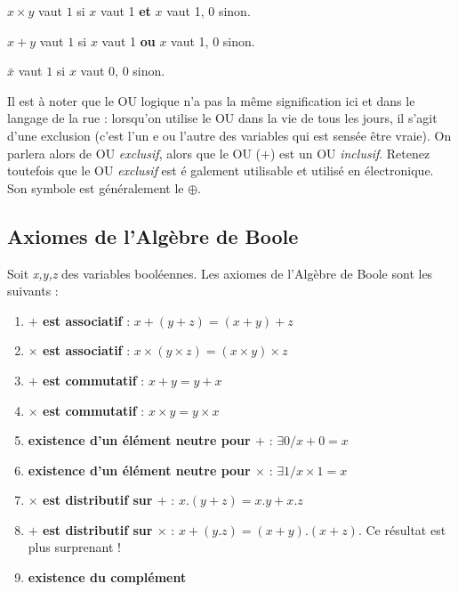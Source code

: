 $x \times y$ vaut $1$ si $x$ vaut 1 {\bf et}  $x$ vaut 1, $0$ sinon.

$x + y$ vaut $1$ si $x$ vaut 1 {\bf ou}  $x$ vaut 1, $0$ sinon.

$\bar{x}$ vaut $1$ si $x$ vaut 0, $0$ sinon.

Il est à noter que le OU logique n'a pas la même signification ici et dans le langage de la rue : lorsqu'on utilise le OU dans la vie de tous les jours, il s'agit d'une exclusion (c'est l'un
e ou l'autre des variables qui est sensée être vraie). On parlera alors de OU {\it exclusif}, alors que le OU ($+$) est un OU {\it inclusif}. Retenez toutefois que le OU {\it exclusif} est é
galement utilisable et utilisé en électronique. Son symbole est généralement le $\oplus$.

\subsection{Axiomes de l'Algèbre de Boole}
Soit {\it x,y,z} des variables booléennes. Les axiomes de l'Algèbre de Boole sont les suivants :

\begin{enumerate}
\item  {\bf $+$ est associatif} :  $x+(y+z)=(x+y)+z$
\item  {\bf $\times$ est associatif} :  $x\times(y\times z)=(x\times y)\times z$
\item  {\bf $+$ est commutatif} :  $x+y=y+x$
\item  {\bf $\times$ est commutatif} :  $x\times y=y\times x$
\item  {\bf existence d'un élément neutre pour $+$} :  $\exists 0 / x+ 0 = x$
\item  {\bf existence d'un élément neutre pour $\times $} :  $\exists 1 / x \times 1 = x$
\item  {\bf $\times$ est distributif sur $+$} : $x.(y+z)=x.y+x.z$
\item  {\bf $+$ est distributif sur $\times$} : $x+(y.z)=(x+y).(x+z)$. Ce résultat est plus surprenant !
\item  {\bf existence du complément}
\end{enumerate}

